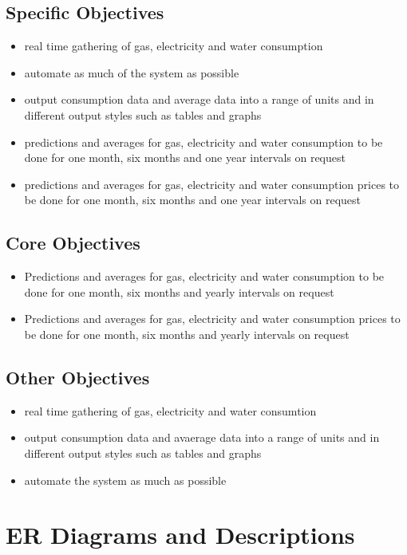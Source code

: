 \subsection{Specific Objectives}
\begin{itemize}
	\item real time gathering of gas, electricity and water consumption
	\item automate as much of the system as possible
	\item output consumption data and average data into a range of units and in different output styles such as tables and graphs 
	\item predictions and averages for gas, electricity and water consumption to be done for one month, six months and one year intervals on request
	\item predictions and averages for gas, electricity and water consumption prices to be done for one month, six months and one year intervals on request
\end{itemize}
\subsection{Core Objectives}
\begin{itemize}
	\item Predictions and averages for gas, electricity and water consumption to be done for one month, six months and yearly intervals on request
	\item Predictions and averages for gas, electricity and water consumption prices to be done for one month, six months and yearly intervals on request
\end{itemize}
\subsection{Other Objectives}
\begin{itemize}
	\item real time gathering of gas, electricity and water consumtion
	\item output consumption data and avaerage data into a range of units and in different output styles such as tables and graphs
	\item automate the system as much as possible
\end{itemize}
\section{ER Diagrams and Descriptions}

